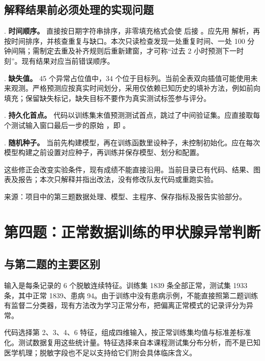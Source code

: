 \documentclass[UTF8,fontset=windows,11pt,a4paper]{ctexart}
\begin{document}
\subsection{解释结果前必须处理的实现问题}

\par{}. \textbf{时间顺序。}  直接按日期字符串排序，非零填充格式会使  后接 。应先用  解析，再按时间排序，并核查重复与缺口。本次只读检查发现一处重复时间、一处 100 分钟间隔；需制定去重及补齐规则后重新建窗，才可称“过去 2 小时预测下一时刻”。现有结果对应当前错误顺序。\par\smallskip
\par{}. \textbf{缺失值。} 45 个异常占位值中，34 个位于目标列。当前全表双向插值可能使用未来观测。严格预测应按真实时间划分，采用仅依赖已知历史的填补方法，例如前向填充；保留缺失标记，缺失目标不要作为真实测试标签参与评分。\par\smallskip
\par{}. \textbf{持久化首点。} 代码以训练集末值预测测试首点，跳过了中间验证集。应直接取每个测试输入窗口最后一步的原始 ，即 。\par\smallskip
\par{}. \textbf{随机种子。} 当前先构建模型，再在训练函数里设种子，未控制初始化。应在每次模型构建之前设置对应种子，再训练并保存模型、划分和配置。\par\smallskip

这些修正会改变实验条件，现有成绩不能直接沿用。当前目录已有代码、结果、图表及报告；本次只解释并指出改法，没有修改队友代码或重跑实验。

来源：项目中的第三题数据处理、模型、主程序、保存指标及报告实验部分。\section{第四题：正常数据训练的甲状腺异常判断}

\subsection{与第二题的主要区别}

输入是每条记录的 6 个脱敏连续特征。训练集 1839 条全部正常，测试集 1933 条，其中正常 1839、患病 94。由于训练中没有患病示例，不能直接照第二题训练有监督二分类器，现有方法改为学习正常分布，把偏离正常模式的记录评分为异常。

代码选择第 2、3、4、6 特征，组成四维输入，按正常训练集均值与标准差标准化。测试数据复用这些统计量。特征选择来自本课程测试集分布分析，而不是已知医学机理；脱敏字段也不足以支持给它们附会具体临床含义。
\end{document}
